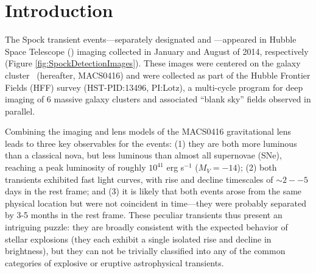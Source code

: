 \section{Introduction}\label{sec:Introduction}

The Spock transient events---separately designated \spockone and
\spocktwo---appeared in Hubble Space Telescope (\HST) imaging collected
in January and August of 2014, respectively (Figure
\ref{fig:SpockDetectionImages}).  These images were centered on the galaxy
cluster \ (hereafter, MACS0416) and were collected as part of
the Hubble Frontier Fields (HFF) survey (HST-PID:13496, PI:Lotz), a
multi-cycle program for deep imaging of 6 massive galaxy clusters and
associated ``blank sky'' fields observed in parallel.

Combining the \HST imaging and lens models of the MACS0416 gravitational
lens leads to three key observables for the \spock events: (1) they are
both more luminous than a classical nova, but less luminous than
almost all supernovae (SNe), reaching a peak luminosity of roughly
$10^{41}$ erg s$^{−1}$ ($M_V=−14$); (2) both transients exhibited fast
light curves, with rise and decline timescales of $\sim2--5$ days in
the rest frame; and (3) it is likely that both events arose from the
same physical location but were not coincident in time---they were
probably separated by 3-5 months in the rest frame. These peculiar
transients thus present an intriguing puzzle: they are broadly
consistent with the expected behavior of stellar explosions (they each
exhibit a single isolated rise and decline in brightness), but they
can not be trivially classified into any of the common categories of
explosive or eruptive astrophysical transients.  


